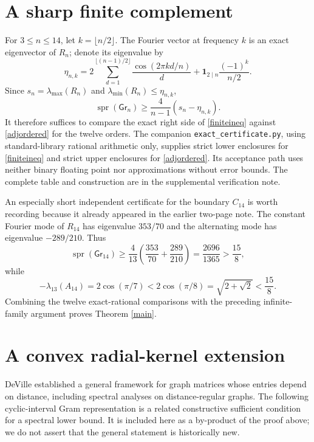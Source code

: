 \documentclass[10pt,twocolumn]{article}
\newcommand{\Gr}{\mathsf{Gr}}
\newcommand{\spr}{\operatorname{spr}}
\newcommand{\lammin}{\lambda_{\min}}
\newcommand{\lammax}{\lambda_{\max}}
\begin{document}
\section{A sharp finite complement}
For $3\le n\le14$, let $k=\lfloor n/2\rfloor$. The Fourier vector at frequency $k$ is an exact eigenvector of $R_n$; denote its eigenvalue by
\begin{equation}\label{etak}
\eta_{n,k}=2\sum_{d=1}^{\lfloor(n-1)/2\rfloor}\frac{\cos(2\pi kd/n)}d
+\mathbf1_{2\mid n}\frac{(-1)^k}{n/2}.
\end{equation}
Since $s_n=\lammax(R_n)$ and $\lammin(R_n)\le\eta_{n,k}$,
\begin{equation}\label{finiteineq}
\spr(\Gr_n)\ge\frac4{n-1}(s_n-\eta_{n,k}).
\end{equation}
It therefore suffices to compare the exact right side of \eqref{finiteineq} against \eqref{adjordered} for the twelve orders. The companion \texttt{exact\_certificate.py}, using standard-library rational arithmetic only, supplies strict lower enclosures for \eqref{finiteineq} and strict upper enclosures for \eqref{adjordered}. Its acceptance path uses neither binary floating point nor approximations without error bounds. The complete table and construction are in the supplemental verification note.

An especially short independent certificate for the boundary $C_{14}$ is worth recording because it already appeared in the earlier two-page note. The constant Fourier mode of $R_{14}$ has eigenvalue $353/70$ and the alternating mode has eigenvalue $-289/210$. Thus
\begin{equation}
\spr(\Gr_{14})\ge\frac4{13}\left(\frac{353}{70}+\frac{289}{210}\right)
=\frac{2696}{1365}>\frac{15}{8},
\end{equation}
while
\[
-\lambda_{13}(A_{14})=2\cos(\pi/7)
<2\cos(\pi/8)=\sqrt{2+\sqrt2}<\frac{15}{8}.
\]
Combining the twelve exact-rational comparisons with the preceding infinite-family argument proves Theorem \ref{main}.

\section{A convex radial-kernel extension}\label{convex}
DeVille \cite{DeVille2022} established a general framework for graph matrices whose entries depend on distance, including spectral analyses on distance-regular graphs. The following cyclic-interval Gram representation is a related constructive sufficient condition for a spectral lower bound. It is included here as a by-product of the proof above; we do not assert that the general statement is historically new.
\end{document}
